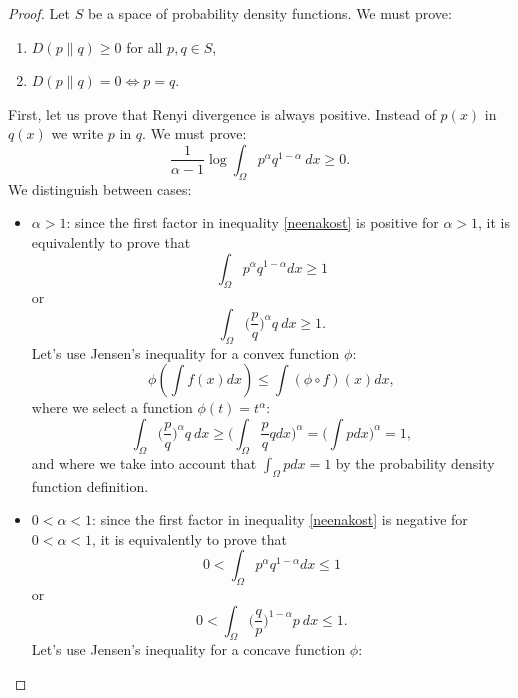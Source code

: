 \documentclass[a4paper, 12pt]{article}
\theoremstyle{definition}
\begin{document}
\begin{proof}
	Let $S$ be a space of probability density functions.
	We must prove:
	\begin{enumerate}
		\item $D(p \| q) \geq 0$ for all $p, q \in S$,
		\item $D(p \| q) = 0 \Leftrightarrow p = q$.
	\end{enumerate}
	First, let us prove that Renyi divergence is always positive. Instead of $p(x)$ in $q(x)$ we write $p$ in $q$. We must prove:
	\begin{equation}
		\label{neenakost}
		\frac{1}{\alpha - 1}\log \int_\Omega p^\alpha q^{1-\alpha} \  dx \geq 0.
	\end{equation}
	We distinguish between cases:
	\begin{itemize}
		\item $\alpha > 1$: since the first factor in inequality \eqref{neenakost} is positive for $ \alpha> 1 $, it is equivalently to prove that
		\begin{equation*}
			\int_\Omega p^\alpha q^{1-\alpha}  dx \geq 1
		\end{equation*}
		or
		\begin{equation*}
			\int_\Omega \Big(\frac{p}{q}\Big)^\alpha q \  dx \geq 1.
		\end{equation*}
		Let's use Jensen's inequality for a convex function $\phi$:
		\begin{equation*}
			\phi(\int f(x) dx) \leq \int (\phi \circ f) (x) dx,
		\end{equation*}
		where we select a function $\phi(t) = t^\alpha$:
		\begin{equation*}
			\int_\Omega \Big(\frac{p}{q}\Big)^\alpha q \  dx \geq \Big(\int_\Omega \frac{p}{q} q dx\Big)^\alpha = \Big(\int p dx\Big)^\alpha = 1,
		\end{equation*}
		and where we take into account that $\int_\Omega p dx = 1$ by the probability density function definition.
		\item $0 < \alpha < 1$: since the first factor in inequality \eqref{neenakost} is negative for $0 < \alpha < 1$,  it is equivalently to prove that
		\begin{equation*}
			0 < \int_\Omega p^\alpha q^{1-\alpha}  dx \leq 1
		\end{equation*}
		or
		\begin{equation*}
			0 <\int_\Omega \Big(\frac{q}{p}\Big)^{1-\alpha} p \  dx \leq 1.
		\end{equation*}
		Let's use Jensen's inequality for a concave function $\phi$:

\end{itemize}
\end{proof}
\end{document}
